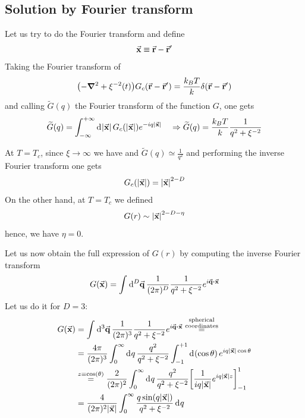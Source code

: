 \documentclass[../main/main.tex]{subfiles}
\begin{document}

\subsection{Solution by Fourier transform}
Let us try to do the Fourier transform and define
\begin{equation}
  \va{x} \equiv \va{r} - \va{r}'
\end{equation}
 Taking the Fourier transform of
\begin{equation}
  \qty(- \grad ^2 + \xi ^{-2} (t)) G_c (\va{r}-\va{r}') = \frac{k_B T}{k} \delta (\va{r}-\va{r}')
\end{equation}
and calling \( \widetilde{G} (q)  \) the Fourier transform of the function \( G \), one gets
\begin{equation}
  \widetilde{G} (q) = \int_{- \infty }^{+ \infty } \dd[]{\abs{\va{x}} } G_c ( \abs{\va{x}} ) e^{- i q \abs{\va{x}} } \quad
   \Rightarrow \widetilde{G} ( q ) = \frac{k_B T}{k} \frac{1}{q^2 + \xi ^{-2}}
\end{equation}
\begin{remark}
At \( T = T_c \), since  \( \xi \rightarrow \infty  \)  we have  and \( \widetilde{G} (q) \simeq \frac{1}{q^2}  \) and performing the inverse Fourier transform one gets
\begin{equation}
  G_c (\abs{\va{x}} ) = \abs{\va{x}}^{2-D}
\end{equation}
On the other hand, at \( T=T_c \) we defined
\begin{equation}
  G (r) \sim \abs{\va{x}}^{2-D- \eta }
\end{equation}
hence, we have \( \eta =0 \).
\end{remark}
Let us now obtain the full expression of \( G(r) \) by computing the inverse Fourier transform
\begin{equation}
  G (\va{x}) = \int_{}^{} \dd[D]{\va{q}}  \frac{1}{(2 \pi )^D} \frac{1}{q^2 + \xi ^{-2}} e^{i \va{q} \vdot \va{x}}
\end{equation}
Let us do it for \( D=3 \):
\begin{equation}
\begin{split}
G(\va{x})  &=  \int_{}^{} \dd[3]{\va{q}}  \frac{1}{(2 \pi )^3} \frac{1}{q^2 + \xi ^{-2}} e^{i \va{q} \vdot \va{x}} \overset{\substack{ \text{spherical} \\ \text{coordinates}} }{=}  \\
& = \frac{4 \pi }{ (2 \pi )^3} \int_{0}^{\infty } \dd[]{q} \frac{q^2}{q^2+ \xi ^{-2}} \int_{-1}^{+1} \dd[]{(\cos \theta  )}    e^{i q \abs{\va{x}} \cos \theta  } \\
& \overset{z \equiv \cos(\theta ) }{=} \frac{2}{(2 \pi )^2} \int_{0}^{\infty } \dd[]{q} \frac{q^2}{q^2 + \xi ^{-2}} \qty[\frac{1}{i q \abs{\va{x}} } e^{i q \abs{\va{x}} z } ]_{-1}^{1}   \\
& = \frac{4}{(2 \pi )^2 \abs{\va{x}} } \int_{0}^{\infty } \frac{q \sin(q \abs{\va{x}} ) }{q^2 + \xi ^{-2}} \dd[]{q}
\end{split}
\end{equation}
\end{document}

